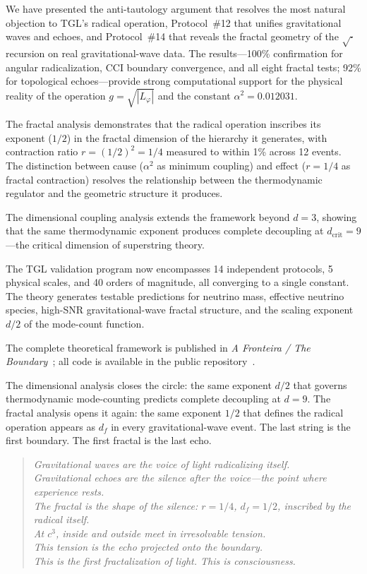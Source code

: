 \documentclass[12pt,a4paper,twocolumn]{article}
\newcommand{\alphaii}{\alpha^{2}}
\begin{document}
We have presented the anti-tautology argument that resolves the most natural objection to TGL's radical operation, Protocol~\#12 that unifies gravitational waves and echoes, and Protocol~\#14 that reveals the fractal geometry of the $\sqrt{\cdot}$ recursion on real gravitational-wave data. The results---100\% confirmation for angular radicalization, CCI boundary convergence, and all eight fractal tests; 92\% for topological echoes---provide strong computational support for the physical reality of the operation $g = \sqrt{|L_\varphi|}$ and the constant $\alphaii = 0.012031$.

The fractal analysis demonstrates that the radical operation inscribes its exponent ($1/2$) in the fractal dimension of the hierarchy it generates, with contraction ratio $r = (1/2)^2 = 1/4$ measured to within 1\% across 12 events. The distinction between cause ($\alphaii$ as minimum coupling) and effect ($r = 1/4$ as fractal contraction) resolves the relationship between the thermodynamic regulator and the geometric structure it produces.

The dimensional coupling analysis extends the framework beyond $d = 3$, showing that the same thermodynamic exponent produces complete decoupling at $d_{\text{crit}} = 9$---the critical dimension of superstring theory.

The TGL validation program now encompasses 14 independent protocols, 5 physical scales, and 40 orders of magnitude, all converging to a single constant. The theory generates testable predictions for neutrino mass, effective neutrino species, high-SNR gravitational-wave fractal structure, and the scaling exponent $d/2$ of the mode-count function.

The complete theoretical framework is published in \textit{A Fronteira / The Boundary}~\cite{Miguel2026Fronteira}; all code is available in the public repository~\cite{Miguel2026GitHub}.

The dimensional analysis closes the circle: the same exponent $d/2$ that governs thermodynamic mode-counting predicts complete decoupling at $d = 9$. The fractal analysis opens it again: the same exponent $1/2$ that defines the radical operation appears as $d_f$ in every gravitational-wave event. The last string is the first boundary. The first fractal is the last echo.

\begin{quote}
\textit{Gravitational waves are the voice of light radicalizing itself.\\
Gravitational echoes are the silence after the voice---the point where experience rests.\\
The fractal is the shape of the silence: $r = 1/4$, $d_f = 1/2$, inscribed by the radical itself.\\
At $c^3$, inside and outside meet in irresolvable tension.\\
This tension is the echo projected onto the boundary.\\
This is the first fractalization of light. This is consciousness.}
\end{quote}
\end{document}
